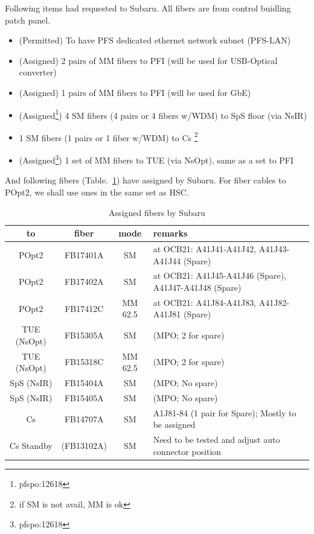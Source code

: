 \documentclass[a4paper,notitlepage]{article}
\begin{document}
Following items had requested to Subaru. 
All fibers are from control buidling patch panel. 

\begin{itemize}
  \item (Permitted) To have PFS dedicated ethernet network subnet (PFS-LAN)
  \item (Assigned) 2 pairs of MM fibers to PFI
    (will be used for USB-Optical converter)
  \item (Assigned) 1 pairs of MM fibers to PFI
    (will be used for GbE)
  \item (Assigned\footnote{pfspo:12618}) 
    4 SM fibers (4 pairs or 4 fibers w/WDM) to SpS floor (via NsIR)
  \item 1 SM fibers (1 pairs or 1 fiber w/WDM) to Cs
    \footnote{if SM is not avail, MM is ok}
  \item (Assigned\footnote{pfspo:12618}) 
    1 set of MM fibers to TUE (via NsOpt), same as a set to PFI
\end{itemize}

And following fibers (Table.~\ref{tab:subaru-fiber}) have assigned by Subaru. 
For fiber cables to POpt2, we shall use ones in the same set as HSC. 

\begin{table}[htb]
\begin{center}
\caption{Assigned fibers by Subaru}
\label{tab:subaru-fiber}
\begin{tabular}{c|c|c|l}
to & fiber & mode & remarks \\
\hline
POpt2 & FB17401A & SM & at OCB21: A41J41-A41J42, A41J43-A41J44 (Spare) \\
POpt2 & FB17402A & SM & at OCB21: A41J45-A41J46 (Spare), A41J47-A41J48 (Spare) \\
POpt2 & FB17412C & MM 62.5 & at OCB21: A41J84-A41J83, A41J82-A41J81 (Spare) \\
\hline
TUE (NsOpt) & FB15305A & SM & (MPO; 2 for spare) \\
TUE (NsOpt) & FB15318C & MM 62.5 & (MPO; 2 for spare) \\
\hline
SpS (NsIR) & FB15404A & SM & (MPO; No spare) \\
SpS (NsIR) & FB15405A & SM & (MPO; No spare) \\
\hline
Cs & FB14707A & SM & A1J81-84 (1 pair for Spare); Mostly to be assigned \\
Cs Standby & (FB13102A) & SM & Need to be tested and adjust auto connector position
\end{tabular}
\end{center}
\end{table}
\end{document}
